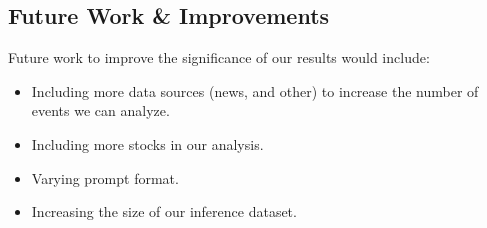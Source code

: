 \documentclass[conference]{IEEEtran}
\begin{document}
\subsection{Future Work \& Improvements}
Future work to improve the significance of our results would include:
\begin{itemize}
    \item Including more data sources (news, and other) to increase the number of events we can analyze.
    \item Including more stocks in our analysis.
    \item Varying prompt format.
    \item Increasing the size of our inference dataset.
\end{itemize}
\newpage
\begin{singlespace}



\onecolumn
\begin{Center}
\appendix

\end{Center}
\end{singlespace}
\end{document}
